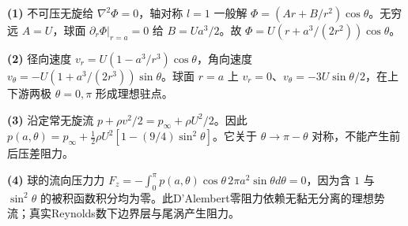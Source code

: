 \par\noindent\textbf{(1)} 不可压无旋给 \(\nabla^2\Phi=0\)，轴对称 \(l=1\) 一般解 \(\Phi=(Ar+B/r^2)\cos\theta\)。无穷远 \(A=U\)，球面 \(\partial_r\Phi|_{r=a}=0\) 给 \(B=Ua^3/2\)。故 \(\Phi=U(r+a^3/(2r^2))\cos\theta\)。
\par\noindent\textbf{(2)} 径向速度 \(v_r=U(1-a^3/r^3)\cos\theta\)，角向速度 \(v_\theta=-U(1+a^3/(2r^3))\sin\theta\)。球面 \(r=a\) 上 \(v_r=0\)、\(v_\theta=-3U\sin\theta/2\)，在上下游两极 \(\theta=0,\pi\) 形成理想驻点。
\par\noindent\textbf{(3)} 沿定常无旋流 \(p+\rho v^2/2=p_\infty+\rho U^2/2\)。因此 \(p(a,\theta)=p_\infty+\tfrac12\rho U^2[1-(9/4)\sin^2\theta]\)。它关于 \(\theta\to\pi-\theta\) 对称，不能产生前后压差阻力。
\par\noindent\textbf{(4)} 球的流向压力力 \(F_z=-\int_0^\pi p(a,\theta)\cos\theta\,2\pi a^2\sin\theta d\theta=0\)，因为含 \(1\) 与 \(\sin^2\theta\) 的被积函数积分均为零。此D’Alembert零阻力依赖无黏无分离的理想势流；真实Reynolds数下边界层与尾涡产生阻力。
